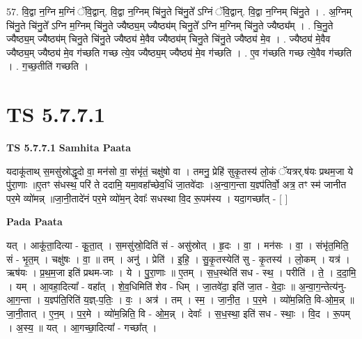 \documentclass[17pt]{extarticle}
\begin{document}
57. वि॒द्वा न॒ग्नि म॒ग्निं ॅवि॒द्वान्. वि॒द्वा न॒ग्निम् चि॑नु॒ते चि॑नु॒ते᳚ ऽग्निं ॅवि॒द्वान्. वि॒द्वा न॒ग्निम् चि॑नु॒ते । . अ॒ग्निम् चि॑नु॒ते चि॑नु॒ते᳚ ऽग्नि म॒ग्निम् चि॑नु॒ते ज्यैष्ठ्य॒म् ज्यैष्ठ्य॑म् चिनु॒ते᳚ ऽग्नि म॒ग्निम् चि॑नु॒ते ज्यैष्ठ्य᳚म् । . चि॒नु॒ते ज्यैष्ठ्य॒म् ज्यैष्ठ्य॑म् चिनु॒ते चि॑नु॒ते ज्यैष्ठ्य॑ मे॒वैव ज्यैष्ठ्य॑म् चिनु॒ते चि॑नु॒ते ज्यैष्ठ्य॑ मे॒व । . ज्यैष्ठ्य॑ मे॒वैव ज्यैष्ठ्य॒म् ज्यैष्ठ्य॑ मे॒व ग॑च्छति गच्छ त्ये॒व ज्यैष्ठ्य॒म् ज्यैष्ठ्य॑ मे॒व ग॑च्छति । . ए॒व ग॑च्छति गच्छ त्ये॒वैव ग॑च्छति । . ग॒च्छ॒तीति॑ गच्छति । \newline
\pagebreak
{}

\section{ TS 5.7.7.1 }

\textbf{TS 5.7.7.1 } \newline
\textbf{Samhita Paata} \newline

यदाकू॑ताथ् स॒मसु॑स्रोद्धृ॒दो वा॒ मन॑सो वा॒ संभृ॑तं॒ चक्षु॑षो वा । तमनु॒ प्रेहि॑ सुकृ॒तस्य॑ लो॒कं ॅयत्रर्.ष॑यः प्रथम॒जा ये पु॑रा॒णाः ॥ए॒तꣳ स॑धस्थ॒ परि॑ ते ददामि॒ यमा॒वहा᳚च्छेव॒धिं जा॒तवे॑दाः ।अ॒न्वा॒ग॒न्ता य॒ज्ञ्प॑तिर्वो॒ अत्र॒ तꣳ स्म॑ जानीत पर॒मे व्यो॑मन्न् ॥जा॒नी॒तादे॑नं पर॒मे व्यो॑म॒न् देवाः᳚ सधस्था वि॒द रू॒पम॑स्य । यदा॒गच्छा᳚त् - [  ] \newline

\textbf{Pada Paata} \newline

यत् । आकू॑ता॒दित्या - कू॒ता॒त् । स॒मसु॑स्रो॒दिति॑ सं - असु॑स्रोत् । हृ॒दः । वा॒ । मन॑सः । वा॒ । संभृ॑त॒मिति॒ सं - भृ॒त॒म् । चक्षु॑षः । वा॒ ॥ तम् । अनु॑ । प्रेति॑ । इ॒हि॒ । सु॒कृ॒तस्येति॑ सु - कृ॒तस्य॑ । लो॒कम् । यत्र॑ । ऋष॑यः । प्र॒थ॒म॒जा इति॑ प्रथम-जाः । ये । पु॒रा॒णाः ॥ ए॒तम् । स॒ध॒स्थेति॑ सध - स्थ॒ । परीति॑ । ते॒ । द॒दा॒मि॒ । यम् । आ॒वहा॒दित्या᳚ - वहा᳚त् । शे॒व॒धिमिति॑ शेव - धिम् । जा॒तवे॑दा॒ इति॑ जा॒त - वे॒दाः॒ ॥ अ॒न्वा॒ग॒न्तेत्य॑नु-आ॒ग॒न्ता । य॒ज्ञ्प॑ति॒रिति॑ य॒ज्ञ्-प॒तिः॒ । वः॒ । अत्र॑ । तम् । स्म॒ । जा॒नी॒त॒ । प॒र॒मे । व्यो॑म॒न्निति॒ वि-ओ॒म॒न्न् ॥ जा॒नी॒तात् । ए॒न॒म् । प॒र॒मे । व्यो॑म॒न्निति॒ वि - ओ॒म॒न्न् । देवाः᳚ । स॒ध॒स्था॒ इति॑ सध - स्थाः॒ । वि॒द । रू॒पम् । अ॒स्य॒ ॥ यत् । आ॒गच्छा॒दित्या᳚ - गच्छा᳚त् ।  \newline
\end{document}
